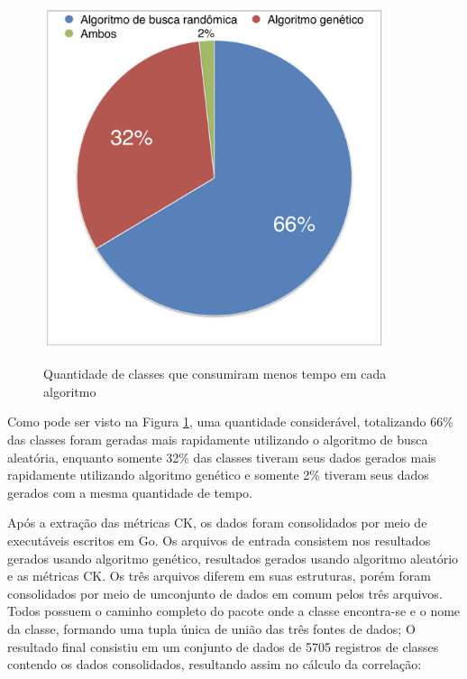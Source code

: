 \documentclass[
	12pt,				%
	oneside,			%
	a4paper,			%
	english,			%
	brazil				%
	]{abntex2ppgsi}
\begin{document}
\begin{figure}[H]%
	\centering
 	  \caption{Quantidade de classes que consumiram menos tempo em cada algoritmo}
		\includegraphics[width=10cm]{tempo_evosuite.png}
	\label{fig:distribuicao-tempo-evosuite}
\end{figure}

Como pode ser visto na Figura \ref{fig:distribuicao-tempo-evosuite}, uma quantidade considerável, totalizando 66\% das classes foram geradas mais rapidamente utilizando o algoritmo de busca aleatória, enquanto somente 32\% das classes tiveram seus dados gerados mais rapidamente utilizando algoritmo genético e somente 2\% tiveram seus dados gerados com a mesma quantidade de tempo.

Após a extração das métricas CK, os dados foram consolidados por meio de executáveis escritos em Go. Os arquivos de entrada consistem nos resultados gerados usando algoritmo genético, resultados gerados usando algoritmo aleatório e as métricas CK. Os três arquivos diferem em suas estruturas, porém foram consolidados por meio de umconjunto de dados em comum pelos três arquivos.  Todos possuem o caminho completo do pacote onde a classe encontra-se e o nome da classe, formando uma tupla única de união das três fontes de dados; O resultado final consistiu em um conjunto de dados de 5705 registros de classes contendo os dados consolidados, resultando assim no cálculo da correlação:
\end{document}

